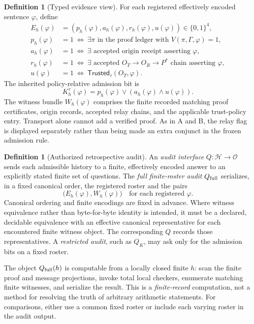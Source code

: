 \documentclass[11pt,letterpaper]{article}
\theoremstyle{definition}
\newtheorem{definition}[theorem]{Definition}
\newcommand{\Hh}{\mathcal H}
\newcommand{\Obs}{\mathcal O}
\newcommand{\Tr}{\mathsf{Trusted}}
\begin{document}
\begin{definition}[Typed evidence view]
For each registered effectively encoded sentence $\varphi$, define
\begin{align*}
E_h(\varphi)&=(p_h(\varphi),a_h(\varphi),r_h(\varphi),u(\varphi))\in\{0,1\}^4,\\
p_h(\varphi)&=1\ \Longleftrightarrow\ \exists\pi\text{ in the proof ledger with }V(\pi,\Gamma,\varphi)=1,\\
a_h(\varphi)&=1\ \Longleftrightarrow\ \exists\text{ accepted origin receipt asserting }\varphi,\\
r_h(\varphi)&=1\ \Longleftrightarrow\ \exists\text{ accepted }O_T\to O_R\to P^*\text{ chain asserting }\varphi,\\
u(\varphi)&=1\ \Longleftrightarrow\ \Tr_\tau(O_T,\varphi).
\end{align*}
The inherited policy-relative admission bit is
\[
K_h^\tau(\varphi)=p_h(\varphi)\lor(a_h(\varphi)\land u(\varphi)).
\]
The witness bundle $W_h(\varphi)$ comprises the finite recorded matching proof certificates, origin records, accepted relay chains, and the applicable trust-policy entry. Transport alone cannot add a verified proof. As in A and B, the relay flag is displayed separately rather than being made an extra conjunct in the frozen admission rule.
\end{definition}

\begin{definition}[Authorized retrospective audit]
An \emph{audit interface} $Q:\Hh\to\Obs$ sends each admissible history to a finite, effectively encoded answer to an explicitly stated finite set of questions. The \emph{full finite-roster audit} $Q_{\rm full}$ serializes, in a fixed canonical order, the registered roster and the pairs
\[
\bigl(E_h(\varphi),W_h(\varphi)\bigr)
\quad\text{for each registered }\varphi.
\]
Canonical ordering and finite encodings are fixed in advance. Where witness equivalence rather than byte-for-byte identity is intended, it must be a declared, decidable equivalence with an effective canonical representative for each encountered finite witness object. The corresponding $Q$ records those representatives. A \emph{restricted audit}, such as $Q_K$, may ask only for the admission bits on a fixed roster.
\end{definition}

The object $Q_{\rm full}(h)$ is computable from a locally closed finite $h$: scan the finite proof and message projections, invoke total local checkers, enumerate matching finite witnesses, and serialize the result. This is a \emph{finite-record} computation, not a method for resolving the truth of arbitrary arithmetic statements. For comparisons, either use a common fixed roster or include each varying roster in the audit output.
\end{document}
